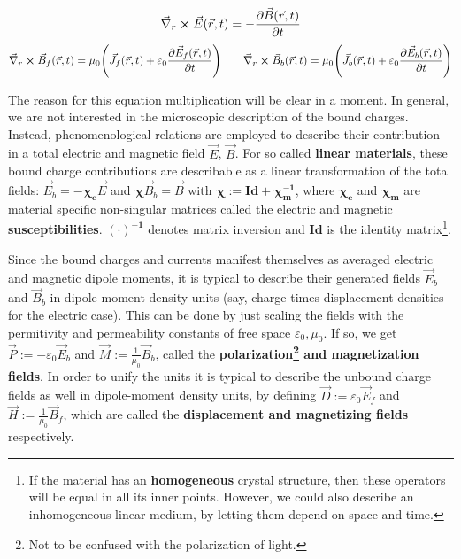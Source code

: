 \documentclass[11pt, a4paper, twoside]{article} %
\begin{document}
\begin{equation}\label{curlBt}
\vec{\nabla }_r\cross \vec{E}(\vec{r},t)=-\pdv{\vec{B}(\vec{r},t)}{t} 
\end{equation}
\begin{equation}\label{anotherone}
\vec{\nabla }_r\cross \vec{B}_f(\vec{r},t)=\mu_0\qty(\vec{J}_f(\vec{r},t)+\varepsilon_0\pdv{\vec{E}_f(\vec{r},t)}{t})\quad \quad  \vec{\nabla }_r\cross \vec{B}_b(\vec{r},t)=\mu_0\qty(\vec{J}_b(\vec{r},t)+\varepsilon_0\pdv{\vec{E}_b(\vec{r},t)}{t})
\end{equation}

The reason for this equation multiplication will be clear in a moment. In general, we are not interested in the microscopic description of the bound charges. Instead, phenomenological relations are employed to describe their contribution in a total electric and magnetic field $\vec{E}$, $\vec{B}$. For so called {\bf linear materials}, these bound charge contributions are describable as a linear transformation of the total fields: $\vec{E}_b=-\pmb{\chi_e} \vec{E}$ and $\pmb{\chi}\vec{B}_b= \vec{B}$ with $\pmb{\chi}:=\pmb{Id}+\pmb{\chi_m^{-1}}$, where $\pmb{\chi_e}$ and $\pmb{\chi_m}$ are material specific non-singular matrices called the electric and magnetic {\bf susceptibilities}. $\pmb{(\cdot)^{-1}}$ denotes matrix inversion and $\pmb{Id}$ is the identity matrix\footnote{If the material has an {\bf homogeneous} crystal structure, then these operators will be equal in all its inner points. However, we could also describe an inhomogeneous linear medium, by letting them depend on space and time. }. 

Since the bound charges and currents manifest themselves as averaged electric and magnetic dipole moments, it is typical to describe their generated fields $\vec{E}_b$ and $\vec{B}_b$ in dipole-moment density units (say, charge times displacement densities for the electric case). This can be done by just scaling the fields with the permitivity and permeability constants of free space $\varepsilon_0,\mu_0$. If so, we get $\vec{P}:=-\varepsilon_0\vec{E}_b$ and $\vec{M}:=\frac{1}{\mu_0}\vec{B}_b$, called the {\bf polarization\footnote{Not to be confused with the polarization of light.} and magnetization fields}. In order to unify the units it is typical to describe the unbound charge fields as well in dipole-moment density units, by defining $\vec{D}:=\varepsilon_0\vec{E}_f$ and $\vec{H}:=\frac{1}{\mu_0}\vec{B}_f$, which are called the {\bf displacement and magnetizing fields} respectively.
\end{document}
